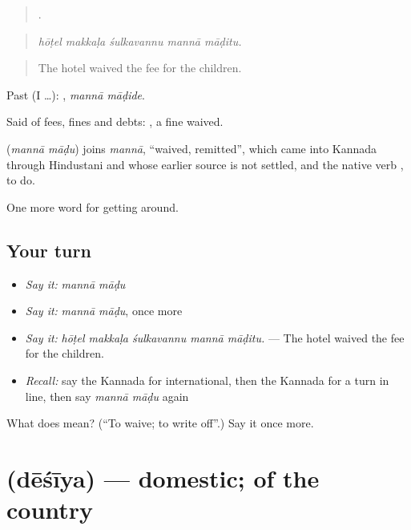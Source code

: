 \begin{quote}
    .
\end{quote}

\begin{quote}
\emph{hōṭel makkaḷa śulkavannu mannā māḍitu.}
\end{quote}

\begin{quote}
The hotel waived the fee for the children.
\end{quote}

Past (I …):  , \emph{mannā māḍide}.

Said of fees, fines and debts:  , a fine waived.

\begin{cousinweb}
\textbf{ } (\emph{mannā māḍu}) joins \emph{mannā}, \textquotedblleft{}waived, remitted\textquotedblright{}, which came into Kannada through Hindustani and whose earlier source is not settled, and the native verb , to do.
\end{cousinweb}

\begin{grammarlens}[title={What you've built}]
One more word for getting around.
\end{grammarlens}

\subsection*{Your turn}
\begin{itemize}
\raggedright
  \item \emph{Say it:} \emph{mannā māḍu}
  \item \emph{Say it:} \emph{mannā māḍu}, once more
  \item \emph{Say it:} \emph{hōṭel makkaḷa śulkavannu mannā māḍitu.} — The hotel waived the fee for the children.
  \item \emph{Recall:} say the Kannada for international, then the Kannada for a turn in line, then say \emph{mannā māḍu} again
\end{itemize}

\begin{tcolorbox}[breakable,colback=teal!4,colframe=teal!35!black,title={Before you move on}]
What does   mean? (\textquotedblleft{}To waive; to write off\textquotedblright{}.) Say it once more.
\end{tcolorbox}
\section[\texorpdfstring{\kn{ದೇಶೀಯ} (dēśīya)}{ದೇಶೀಯ (dēśīya)}]{ (dēśīya) — domestic; of the country}

